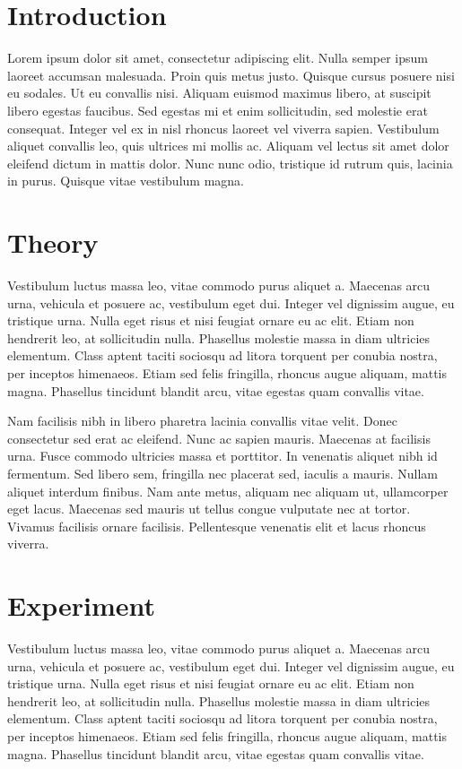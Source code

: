 \documentclass[a4paper,12pt]{article}
\begin{document}
\begin{multicols}{2}
	\section{Introduction}
		Lorem ipsum dolor sit amet, consectetur adipiscing elit. Nulla semper ipsum laoreet accumsan malesuada. Proin quis metus justo. Quisque cursus posuere nisi eu sodales. Ut eu convallis nisi. Aliquam euismod maximus libero, at suscipit libero egestas faucibus. Sed egestas mi et enim sollicitudin, sed molestie erat consequat. Integer vel ex in nisl rhoncus laoreet vel viverra sapien. Vestibulum aliquet convallis leo, quis ultrices mi mollis ac. Aliquam vel lectus sit amet dolor eleifend dictum in mattis dolor. Nunc nunc odio, tristique id rutrum quis, lacinia in purus. Quisque vitae vestibulum magna.
		
	\section{Theory}
		Vestibulum luctus massa leo, vitae commodo purus aliquet a. Maecenas arcu urna, vehicula et posuere ac, vestibulum eget dui. Integer vel dignissim augue, eu tristique urna. Nulla eget risus et nisi feugiat ornare eu ac elit. Etiam non hendrerit leo, at sollicitudin nulla. Phasellus molestie massa in diam ultricies elementum. Class aptent taciti sociosqu ad litora torquent per conubia nostra, per inceptos himenaeos. Etiam sed felis fringilla, rhoncus augue aliquam, mattis magna. Phasellus tincidunt blandit arcu, vitae egestas quam convallis vitae.
		
		Nam facilisis nibh in libero pharetra lacinia convallis vitae velit. Donec consectetur sed erat ac eleifend. Nunc ac sapien mauris. Maecenas at facilisis urna. Fusce commodo ultricies massa et porttitor. In venenatis aliquet nibh id fermentum. Sed libero sem, fringilla nec placerat sed, iaculis a mauris. Nullam aliquet interdum finibus. Nam ante metus, aliquam nec aliquam ut, ullamcorper eget lacus. Maecenas sed mauris ut tellus congue vulputate nec at tortor. Vivamus facilisis ornare facilisis. Pellentesque venenatis elit et lacus rhoncus viverra.
		
	\section{Experiment}
		Vestibulum luctus massa leo, vitae commodo purus aliquet a. Maecenas arcu urna, vehicula et posuere ac, vestibulum eget dui. Integer vel dignissim augue, eu tristique urna. Nulla eget risus et nisi feugiat ornare eu ac elit. Etiam non hendrerit leo, at sollicitudin nulla. Phasellus molestie massa in diam ultricies elementum. Class aptent taciti sociosqu ad litora torquent per conubia nostra, per inceptos himenaeos. Etiam sed felis fringilla, rhoncus augue aliquam, mattis magna. Phasellus tincidunt blandit arcu, vitae egestas quam convallis vitae.
		

\end{multicols}
\end{document}
